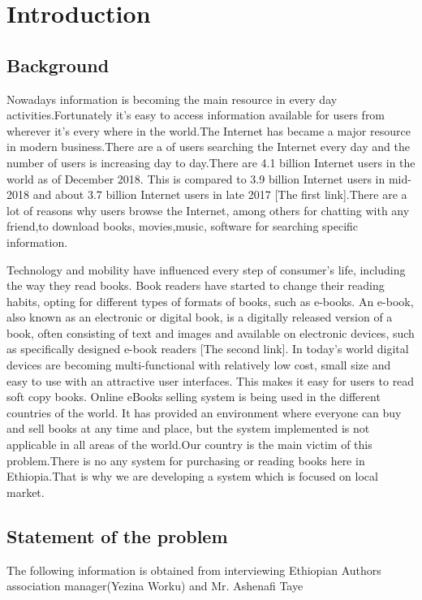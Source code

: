 \chapter{Introduction}
\section{Background}
Nowadays information is becoming the main resource in every day activities.Fortunately it's easy to access information available for users from wherever it's every where in the world.The Internet has became a major resource in modern business.There are a of users searching the Internet every day and the number of users is increasing day to day.There are 4.1 billion Internet users in the world as of December 2018. This is compared to 3.9 billion Internet users in mid-2018 and about 3.7 billion Internet users in late 2017 [The first link].There are a lot of reasons why users browse the Internet, among others for chatting with any friend,to download books, movies,music, software for searching specific information.


Technology and mobility have influenced every step of consumer’s life, including the way they read books. Book readers have started to change their reading habits, opting for different types of formats of books, such as e-books. An e-book, also known as an electronic or digital book, is a digitally released version of a book, often consisting of text and images and available on electronic devices, such as specifically designed e-book readers [The second link]. In today’s world digital devices are becoming multi-functional with relatively low cost, small size and easy to use with an attractive user interfaces. This makes it easy for users  to read  soft copy books.
Online eBooks selling system is being  used in the different countries of the  world. It has provided an environment where everyone can buy and sell books at any time and place, but the system implemented is not applicable in all areas of the world.Our country is the main victim of this problem.There is no any system for purchasing or reading books here in Ethiopia.That is why we are developing a system which is focused on local market.


\section{Statement of the problem}
The following information is obtained from interviewing Ethiopian Authors association manager(Yezina Worku) and Mr. Ashenafi Taye 

